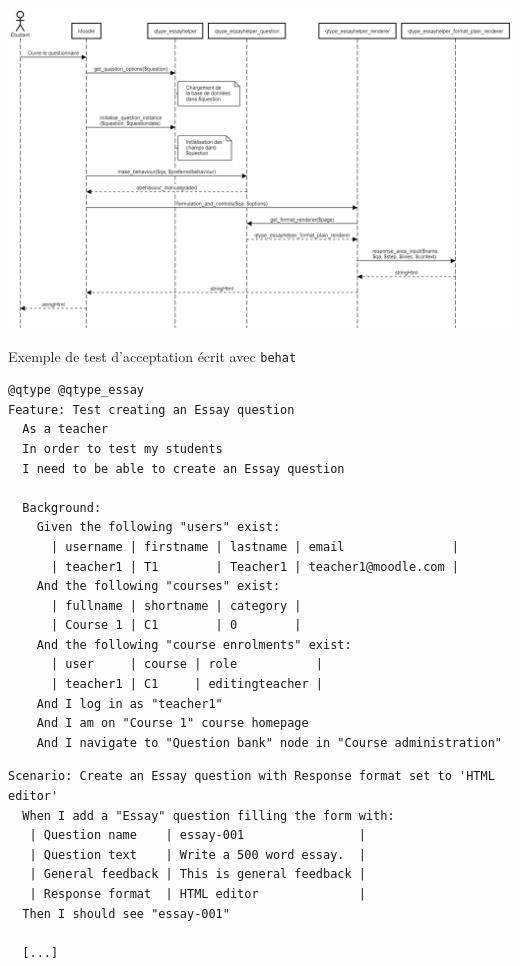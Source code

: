 \documentclass{beamer}
\begin{document}
  \begin{frame}[plain]
    \begin{center}
    \hspace*{-0.9cm}\includegraphics[scale=0.245]{../images/diagramme-flux.png}
    \end{center}
  \end{frame}
  
  \begin{frame}
    \alert{Exemple de test d'acceptation \'ecrit avec \texttt{behat}}
\begin{lstlisting}[language=behat,frame=l,numbers=none,basicstyle=\footnotesize]
@qtype @qtype_essay
Feature: Test creating an Essay question
  As a teacher
  In order to test my students
  I need to be able to create an Essay question

  Background:
    Given the following "users" exist:
      | username | firstname | lastname | email               |
      | teacher1 | T1        | Teacher1 | teacher1@moodle.com |
    And the following "courses" exist:
      | fullname | shortname | category |
      | Course 1 | C1        | 0        |
    And the following "course enrolments" exist:
      | user     | course | role           |
      | teacher1 | C1     | editingteacher |
    And I log in as "teacher1"
    And I am on "Course 1" course homepage
    And I navigate to "Question bank" node in "Course administration"
\end{lstlisting}
\end{frame}
 
 \begin{frame}
\begin{lstlisting}[language=behat,frame=l,numbers=none,basicstyle=\footnotesize]
Scenario: Create an Essay question with Response format set to 'HTML editor'
  When I add a "Essay" question filling the form with:
   | Question name    | essay-001                |
   | Question text    | Write a 500 word essay.  |
   | General feedback | This is general feedback |
   | Response format  | HTML editor              |
  Then I should see "essay-001"

  [...]
\end{lstlisting}
\end{frame}
  
\end{document}
